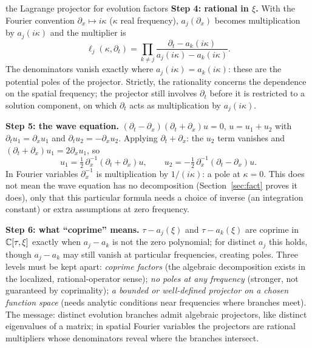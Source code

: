 \begin{explained}{the Lagrange projector for evolution factors}
\medskip\textbf{Step 4: rational in $\xi$.} With the Fourier convention $\partial_x\mapsto i\kappa$ ($\kappa$ real frequency), $a_j(\partial_x)$ becomes multiplication by $a_j(i\kappa)$ and the multiplier is
\[
\ell_j(\kappa,\partial_t)=\prod_{k\ne j}\frac{\partial_t-a_k(i\kappa)}{a_j(i\kappa)-a_k(i\kappa)} .
\]
The denominators vanish exactly where $a_j(i\kappa)=a_k(i\kappa)$: these are the potential poles of the projector. Strictly, the rationality concerns the dependence on the spatial frequency; the projector still involves $\partial_t$ before it is restricted to a solution component, on which $\partial_t$ acts as multiplication by $a_j(i\kappa)$.

\medskip\textbf{Step 5: the wave equation.} $(\partial_t-\partial_x)(\partial_t+\partial_x)u=0$, $u=u_1+u_2$ with $\partial_tu_1=\partial_xu_1$ and $\partial_tu_2=-\partial_xu_2$. Applying $\partial_t+\partial_x$: the $u_2$ term vanishes and $(\partial_t+\partial_x)u_1=2\partial_xu_1$, so
\[
u_1=\tfrac12\,\partial_x^{-1}(\partial_t+\partial_x)u,\qquad u_2=-\tfrac12\,\partial_x^{-1}(\partial_t-\partial_x)u .
\]
In Fourier variables $\partial_x^{-1}$ is multiplication by $1/(i\kappa)$: a pole at $\kappa=0$. This does not mean the wave equation has no decomposition (Section~\ref{sec:fact} proves it does), only that this particular formula needs a choice of inverse (an integration constant) or extra assumptions at zero frequency.

\medskip\textbf{Step 6: what ``coprime'' means.} $\tau-a_j(\xi)$ and $\tau-a_k(\xi)$ are coprime in $\mathbb{C}[\tau,\xi]$ exactly when $a_j-a_k$ is not the zero polynomial; for distinct $a_j$ this holds, though $a_j-a_k$ may still vanish at particular frequencies, creating poles. Three levels must be kept apart: \emph{coprime factors} (the algebraic decomposition exists in the localized, rational-operator sense); \emph{no poles at any frequency} (stronger, not guaranteed by coprimality); \emph{a bounded or well-defined projector on a chosen function space} (needs analytic conditions near frequencies where branches meet). The message: distinct evolution branches admit algebraic projectors, like distinct eigenvalues of a matrix; in spatial Fourier variables the projectors are rational multipliers whose denominators reveal where the branches intersect.
\end{explained}

